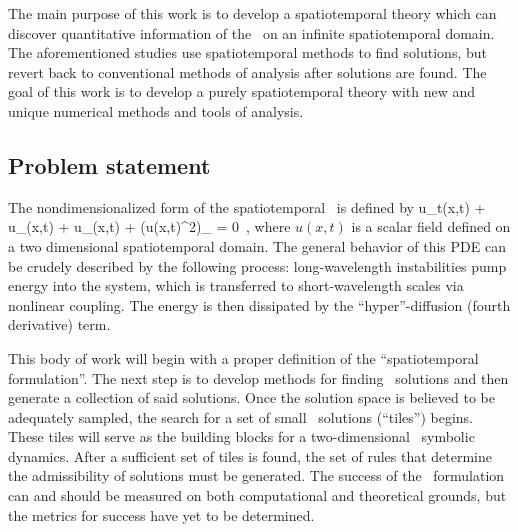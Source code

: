 The main purpose of this work is to develop a spatiotemporal theory which can discover
quantitative information of the \KSe\ on an infinite spatiotemporal domain. The aforementioned
studies use spatiotemporal methods to find
solutions, but revert back to conventional methods of analysis after solutions
are found. The goal of this work is to develop a purely spatiotemporal theory with new and unique
numerical methods and tools of analysis.

\newpage
\subsection{Problem statement}
\label{subsection:summary}
The nondimensionalized form of the spatiotemporal \KSe\ is defined by
\beq
u_t(x,t) + u_{\conf \conf}(x,t) + u_{\conf \conf \conf \conf}(x,t)
         + (u(x,t)^2)_{\conf} = 0
\,,
where $u(x,t)$ is a scalar field defined on a two dimensional spatiotemporal domain. The general
behavior of this PDE can be crudely described by the following process: long-wavelength instabilities
pump energy into the system, which is transferred to short-wavelength scales via nonlinear
coupling. The energy is then dissipated by the ``hyper''-diffusion (fourth derivative) term.


This body of work will begin with a proper definition of the ``spatiotemporal formulation''.
The next step is to develop methods for finding \spt\ solutions and then generate a collection of
said solutions.
Once the solution space is believed to be adequately sampled, the search for
a set of small \spt\ solutions (``tiles'') begins. These tiles will serve as the
building blocks for a two-dimensional \spt\ symbolic dynamics.
After a sufficient set of tiles is found, the set of rules that determine the admissibility
of solutions must be generated. The success of the \spt\ formulation can and should be
measured on both computational and theoretical grounds, but the metrics for success have
yet to be determined.
